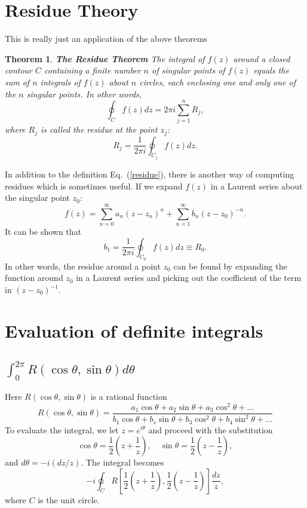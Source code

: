 \documentclass[11pt, letterpaper]{article}
\newtheorem{thm}{Theorem}
\begin{document}
\section{Residue Theory}
This is really just an application of the above theorems
\begin{thm}
{\bf The Residue Theorem} The integral of $f(z)$ around a closed contour $C$ containing a finite number $n$ of singular points
of $f(z)$ equals the sum of $n$ integrals of $f(z)$ about $n$ circles, each enclosing one and only one of the $n$ singular
points. In other words,
\begin{equation}
	\oint_C f(z)dz = 2\pi i\sum_{j=1}^n R_j,
\end{equation}
where $R_j$ is called the residue at the point $z_j$:
\begin{equation}
	R_j = \frac{1}{2\pi i}\oint_{C_j}f(z)dz. \label{residue}
\end{equation}
\end{thm}
In addition to the definition Eq.~(\ref{residue}), there is another way of computing residues which is sometimes useful.
If we expand $f(z)$ in a Laurent series about the singular point $z_0$:
\begin{equation}
	f(z) = \sum_{n=0}^\infty a_n(z-z_n)^n + \sum_{n=1}^\infty b_n(z-z_0)^{-n}.
\end{equation}
It can be shown that
\begin{equation}
	b_1 = \frac{1}{2\pi i}\oint_{C_0}f(z)dz \equiv R_0.
\end{equation}
In other words, the residue around a point $z_0$ can be found by expanding the function around $z_0$ in a Laurent
series and picking out the coefficient of the term in $(z-z_0)^{-1}$.


\section{Evaluation of definite integrals}

\subsection{$\displaystyle\int_0^{2\pi}R(\cos\theta, \sin\theta)d\theta$}
\label{sec:a}
Here $R(\cos\theta, \sin\theta)$ is a rational function
\begin{equation}
	R(\cos\theta, \sin\theta) = \frac{a_1\cos\theta + a_2\sin\theta + a_3\cos^2\theta + \ldots}
									 {b_1\cos\theta + b_s\sin\theta + b_3\cos^2\theta + b_4\sin^2\theta + \ldots}
\end{equation}
To evaluate the integral, we let $z=e^{i\theta}$ and proceed with the substitution
\begin{equation}
	\cos\theta = \frac{1}{2}\left(z + \frac{1}{z}\right),\,\,\,\,\,\,
	\sin\theta = \frac{1}{2}\left(z - \frac{1}{z}\right),
\end{equation}
and $d\theta = -i(dz/z)$. The integral becomes
\begin{equation}
	-i\oint_C R\left[\frac{1}{2}\left(z + \frac{1}{z}\right), \frac{1}{2}\left(z - \frac{1}{z}\right)\right]\frac{dz}{z},
\end{equation}
where $C$ is the unit circle.
\end{document}
